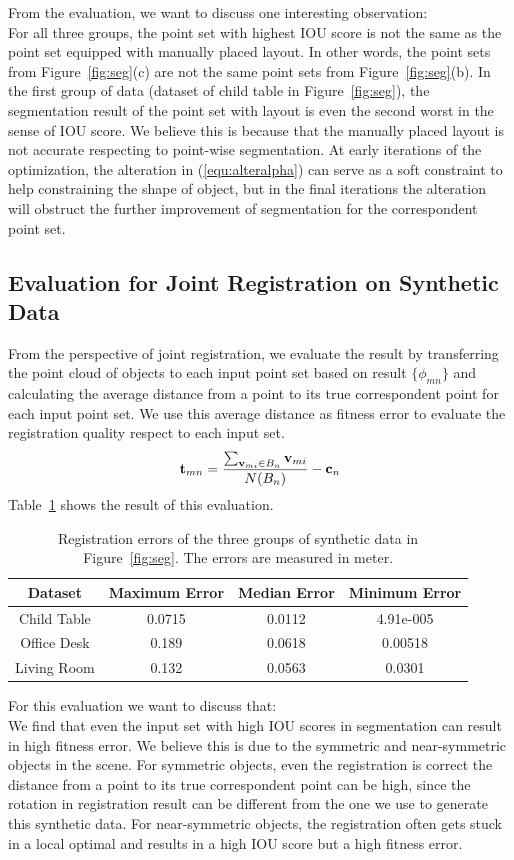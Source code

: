 From the evaluation, we want to discuss one interesting observation:\\
%
For all three groups, the point set with highest IOU score is not the same as the point set equipped with manually placed layout.
In other words, the point sets from Figure~\ref{fig:seg}(c) are not the same point sets from Figure~\ref{fig:seg}(b). 
In the first group of data (dataset of child table in Figure~\ref{fig:seg}), the segmentation result of the point set with layout is even the second worst in the sense of IOU score. We believe this is because that the manually placed layout is not accurate respecting to point-wise segmentation. 
At early iterations of the optimization, the alteration in (\ref{equ:alteralpha}) can serve as a soft constraint to help constraining the shape of object, but in the final iterations the alteration will obstruct the further improvement of segmentation for the correspondent point set. 


\subsection{Evaluation for Joint Registration on Synthetic Data}
%
From the perspective of joint registration, we evaluate the result by transferring the point cloud of objects to each input point set based on result $\{\phi_{mn}\}$ and calculating the average distance from a point to its true correspondent point for each input point set.
%
We use this average distance as fitness error to evaluate the registration quality respect to each input set.
\begin{equation}
\label{equ:error}
\mathbf{t}_{mn}=\frac{\sum_{\mathbf{v}_{mi} \in B_n}\mathbf{v}_{mi}}{N(B_n)}-\mathbf{c}_n
\end{equation}
Table~\ref{tab:regerror} shows the result of this evaluation.

\begin{table}
	\centering
	\begin{tabular}{c c c c}
		Dataset & Maximum Error & Median Error & Minimum Error \\
		\hline
		Child Table & 0.0715 & 0.0112 & 4.91e-005 \\   
		Office Desk & 0.189  & 0.0618 & 0.00518 \\
		Living Room & 0.132  & 0.0563 & 0.0301\\
	\end{tabular}
	\caption{Registration errors of the three groups of synthetic data in Figure~\ref{fig:seg}. The errors are measured in meter. }
	\label{tab:regerror}
\end{table}
For this evaluation we want to discuss that:\\
We find that even the input set with high IOU scores in segmentation can result in high fitness error. We believe this is due to the symmetric and near-symmetric objects in the scene. For symmetric objects, even the registration is correct the distance from a point to its true correspondent point can be high, since the rotation in registration result can be different from the one we use to generate this synthetic data. For near-symmetric objects, the registration often gets stuck in a local optimal and results in a high IOU score but a high fitness error.

